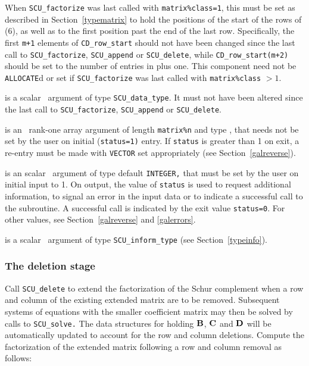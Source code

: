 \documentclass{galahad}
\newcommand{\packagename}{SCU}
\begin{document}
\begin{description}
\begin{description}
When {\tt \packagename\_factorize} was last called with {\tt matrix\%class=1},
this must be set as described in Section~\ref{typematrix} to hold the
positions of the start of the rows of (6), as well as to the first
position past the end of the last row.
Specifically, the first {\tt m+1} elements
of {\tt CD\_row\_start} should not have been changed since the last call to
{\tt \packagename\_factorize}, {\tt \packagename\_append} or
{\tt \packagename\_delete}, while
{\tt CD\_row\_start(m+2)} should be set to the number of entries in
 plus one.
This component need not be {\tt ALLOCATE}d or set if
{\tt \packagename\_factorize} was last called with {\tt matrix\%class} $> 1$.

\end{description}

 is a scalar \intentinout\ argument of type
{\tt \packagename\_data\_type}.
It must not have been altered since the last call to
{\tt \packagename\_factorize},
{\tt \packagename\_append} or
{\tt \packagename\_delete}.

 is an \intentinout\ rank-one array argument of length
{\tt matrix\%n}
and type \realdp, that needs not be set by
the user on initial ({\tt status=1)} entry. If {\tt status} is greater than
1 on exit, a re-entry must be made with {\tt VECTOR} set appropriately
(see Section~\ref{galreverse}).

 is an scalar \intentinout\ argument of type default
{\tt INTEGER,} that
must be set by the user on initial input to 1. On output, the value of
{\tt status}
is used to request additional information, to signal an error
in the input data or to indicate a successful call to the subroutine.
A successful call is indicated by the exit value {\tt status=0}.
For other values, see Section~\ref{galreverse} and \ref{galerrors}.

 is a scalar \intentinout\ argument of type
{\tt \packagename\_inform\_type} (see Section~\ref{typeinfo}).

\end{description}


\subsubsection{The deletion stage}
Call {\tt \packagename\_delete} to extend the factorization of the Schur
complement when a row and column of the existing
extended matrix are to be removed.
Subsequent systems of equations with the smaller
coefficient matrix may then be solved by calls to {\tt \packagename\_solve.}
The data structures for holding ${\mathbf{B}}$, ${\mathbf{C}}$ and ${\mathbf{D}}$ will be
automatically updated to account for the row and column deletions.
Compute the factorization of the extended matrix
following a row and column removal as follows:
\vspace*{1mm}
\end{document}
